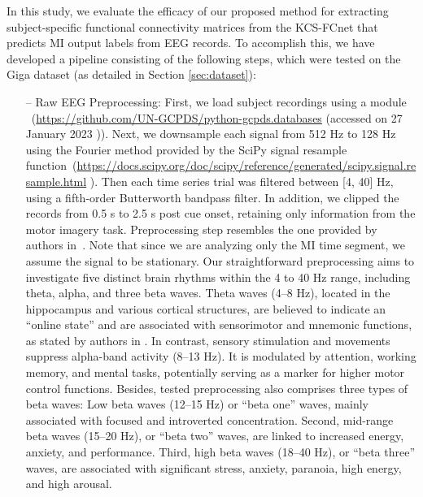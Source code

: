 In this study, we evaluate the efficacy of our proposed method for extracting subject-specific functional connectivity matrices from the KCS-FCnet that predicts MI output labels from EEG records. To accomplish this, we have developed a pipeline consisting of the following steps, which were tested on the Giga dataset (as detailed in Section \ref{sec:dataset}): 

\begin{itemize}
    \item[--] {{Raw EEG Preprocessing:} 
    } First, we load subject recordings using a  {module} 
    ~(\url{https://github.com/UN-GCPDS/python-gcpds.databases} ({accessed on 27 January 2023}
    )). Next, we downsample each signal from 512 Hz to 128 Hz using the Fourier method provided by the SciPy signal resample function~(\url{https://docs.scipy.org/doc/scipy/reference/generated/scipy.signal.resample.html} ). Then each time series trial was filtered between [4, 40] Hz, using a fifth-order Butterworth bandpass filter. In addition, we clipped the records from 0.5 s to 2.5 s post cue onset, retaining only information from the motor imagery task. Preprocessing step resembles the one provided by authors in~\cite{lawhern2018eegnet}. Note that since we are analyzing only the MI time segment, we assume the signal to be stationary. Our straightforward preprocessing aims to investigate five distinct brain rhythms within the 4 to 40 Hz range, including theta, alpha, and three beta waves. Theta waves (4--8 Hz), located in the hippocampus and various cortical structures, are believed to indicate an ``online state'' and are associated with sensorimotor and mnemonic functions, as stated by authors in \cite{ABHANG201651}. In contrast, sensory stimulation and movements suppress alpha-band activity (8--13 Hz). It is modulated by attention, working memory, and mental tasks, potentially serving as a marker for higher motor control functions. Besides, tested preprocessing also comprises three types of beta waves: Low beta waves (12--15 Hz) or ``beta one'' waves, mainly associated with focused and introverted concentration. Second, mid-range beta waves (15--20 Hz), or ``beta two'' waves, are linked to increased energy, anxiety, and performance. Third, high beta waves (18--40 Hz), or ``beta three'' waves, are associated with significant stress, anxiety, paranoia, high energy, and high arousal.
    

\end{itemize}
